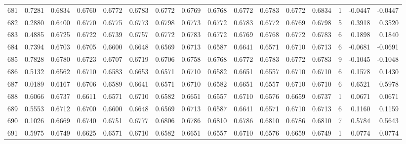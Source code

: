 \begin{tabular}{lrrrrrrrrrrrrrrr}
681 &      0.7281 &  0.6834 &  0.6760 &  0.6772 &  0.6783 &  0.6772 &  0.6769 &  0.6768 &  0.6772 &  0.6783 &   0.6772 &     0.6834 &      1 &                   -0.0447 &                    -0.0447 \\
682 &      0.2880 &  0.6400 &  0.6770 &  0.6775 &  0.6773 &  0.6798 &  0.6773 &  0.6772 &  0.6783 &  0.6772 &   0.6769 &     0.6798 &      5 &                    0.3918 &                     0.3520 \\
683 &      0.4885 &  0.6725 &  0.6722 &  0.6739 &  0.6757 &  0.6772 &  0.6783 &  0.6772 &  0.6769 &  0.6768 &   0.6772 &     0.6783 &      6 &                    0.1898 &                     0.1840 \\
684 &      0.7394 &  0.6703 &  0.6705 &  0.6600 &  0.6648 &  0.6569 &  0.6713 &  0.6587 &  0.6641 &  0.6571 &   0.6710 &     0.6713 &      6 &                   -0.0681 &                    -0.0691 \\
685 &      0.7828 &  0.6780 &  0.6723 &  0.6707 &  0.6719 &  0.6706 &  0.6758 &  0.6768 &  0.6772 &  0.6783 &   0.6772 &     0.6783 &      9 &                   -0.1045 &                    -0.1048 \\
686 &      0.5132 &  0.6562 &  0.6710 &  0.6583 &  0.6653 &  0.6571 &  0.6710 &  0.6582 &  0.6651 &  0.6557 &   0.6710 &     0.6710 &      6 &                    0.1578 &                     0.1430 \\
687 &      0.0189 &  0.6167 &  0.6706 &  0.6589 &  0.6641 &  0.6571 &  0.6710 &  0.6582 &  0.6651 &  0.6557 &   0.6710 &     0.6710 &      6 &                    0.6521 &                     0.5978 \\
688 &      0.6066 &  0.6737 &  0.6611 &  0.6571 &  0.6710 &  0.6582 &  0.6651 &  0.6557 &  0.6710 &  0.6576 &   0.6659 &     0.6737 &      1 &                    0.0671 &                     0.0671 \\
689 &      0.5553 &  0.6712 &  0.6700 &  0.6600 &  0.6648 &  0.6569 &  0.6713 &  0.6587 &  0.6641 &  0.6571 &   0.6710 &     0.6713 &      6 &                    0.1160 &                     0.1159 \\
690 &      0.1026 &  0.6669 &  0.6740 &  0.6751 &  0.6777 &  0.6806 &  0.6786 &  0.6810 &  0.6786 &  0.6810 &   0.6786 &     0.6810 &      7 &                    0.5784 &                     0.5643 \\
691 &      0.5975 &  0.6749 &  0.6625 &  0.6571 &  0.6710 &  0.6582 &  0.6651 &  0.6557 &  0.6710 &  0.6576 &   0.6659 &     0.6749 &      1 &                    0.0774 &                     0.0774 \\

\end{tabular}
